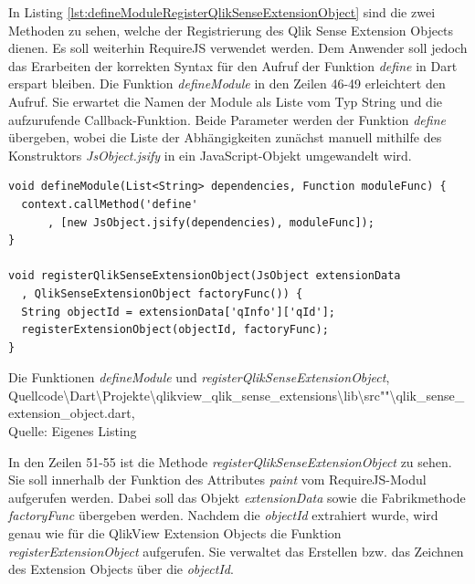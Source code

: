In Listing \ref{lst:defineModuleRegisterQlikSenseExtensionObject} sind die zwei Methoden zu sehen, welche der Registrierung des Qlik Sense Extension Objects dienen. Es soll weiterhin RequireJS verwendet werden. Dem Anwender soll jedoch das Erarbeiten der korrekten Syntax für den Aufruf der Funktion \textit{define} in Dart erspart bleiben. Die Funktion \textit{defineModule} in den Zeilen 46-49 erleichtert den Aufruf. Sie erwartet die Namen der Module als Liste vom Typ String und die aufzurufende Callback-Funktion. Beide Parameter werden der Funktion \textit{define} übergeben, wobei die Liste der Abhängig\-keiten zunächst manuell mithilfe des Konstruktors \textit{JsObject.jsify} in ein JavaScript-Objekt umgewandelt wird.



\ifIncludeFigures\begin{listing}[htbp]
\begin{verbatim}
void defineModule(List<String> dependencies, Function moduleFunc) {
  context.callMethod('define'
      , [new JsObject.jsify(dependencies), moduleFunc]);
}

void registerQlikSenseExtensionObject(JsObject extensionData
  , QlikSenseExtensionObject factoryFunc()) {
  String objectId = extensionData['qInfo']['qId'];
  registerExtensionObject(objectId, factoryFunc);
}
\end{verbatim}
\caption[Die Funktionen \textit{defineModule} und \textit{registerQlikSenseExtensionObject}]{Die Funktionen \textit{defineModule} und \textit{registerQlikSenseExtensionObject}, \\Quellcode\textbackslash{}Dart\textbackslash{}Projekte\textbackslash{}qlikview\_qlik\_sense\_extensions\textbackslash{}lib\textbackslash{}src""\textbackslash{}qlik\_sense\_extension\_object.dart, \\Quelle: Eigenes Listing}
\label{lst:defineModuleRegisterQlikSenseExtensionObject}
\end{listing}\fi

In den Zeilen 51-55 ist die Methode \textit{registerQlikSenseExtensionObject} zu sehen. Sie soll innerhalb der Funktion des Attributes \textit{paint} vom RequireJS-Modul aufgerufen werden. Dabei soll das Objekt \textit{extensionData} sowie die Fabrikmethode \textit{factoryFunc} übergeben werden. Nachdem die \textit{objectId} extrahiert wurde, wird genau wie für die QlikView Extension Objects die Funktion \textit{registerExtensionObject} aufgerufen. Sie verwaltet das Erstellen bzw. das Zeichnen des Extension Objects über die \textit{objectId}.

